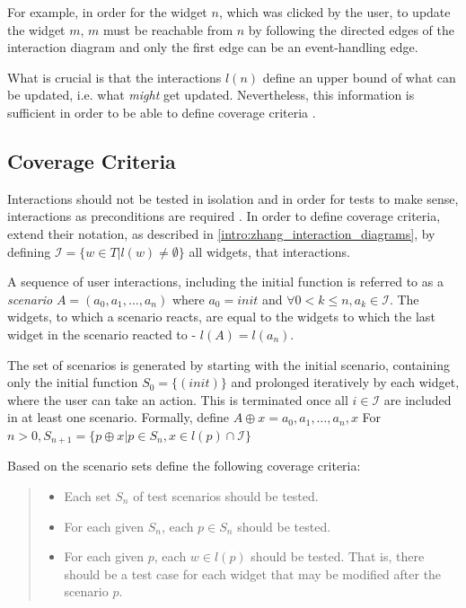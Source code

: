 For example, in order for the widget $n$, which was clicked by the user, to update the widget $m$, $m$ must be reachable from $n$ by following the directed edges of the interaction diagram and only the first edge can be an event-handling edge.

What is crucial is that the interactions $l(n)$ define an upper bound of what can be updated, i.e. what \textit{might} get updated. Nevertheless, this information is sufficient in order to be able to define coverage criteria \parencite{zhang2019scenario}.

\subsection{Coverage Criteria}
Interactions should not be tested in isolation and in order for tests to make sense, interactions as preconditions are required \parencite{zhang2019scenario}. 
In order to define coverage criteria, \textcite{zhang2019scenario} extend their notation, as described in \ref{intro:zhang_interaction_diagrams}, by defining $\mathcal{I}  = \{w\in T | l(w) \neq \emptyset \}$ all widgets, that interactions.

A sequence of user interactions, including the initial function is referred to as a \textit{scenario} $A=(a_0,a_1,\ldots, a_n)$ where $a_0=init$ and $\forall0 < k \leq n, a_k \in \mathcal{I}$. The widgets, to which a scenario reacts, are equal to the widgets to which the last widget in the scenario reacted to - $l(A)=l(a_n)$. 


The set of scenarios is generated by starting with the initial scenario, containing only the initial function $S_0 = \{(init)\}$ and prolonged  iteratively by each widget, where the user can take an action. This is terminated once all $i \in \mathcal{I}$ are included in at least one scenario. 
Formally, define $A \oplus x = a_0,a_1,\ldots,a_n,x$ For $n > 0, S_{n+1}= \{ p \oplus x |p \in S_n, x \in l(p) \cap \mathcal{I}\}$ 

Based on the scenario sets \textcite{zhang2019scenario} define the following coverage criteria:
\begin{quote}
\begin{itemize}
  \item Each set $S_n$ of test scenarios should be tested.
  \item For each given $S_n$, each $p \in S_n$ should be tested.
  \item For each given $p$, each $w \in l(p)$ should be tested. That is, there should be a
  test case for each widget that may be modified after the scenario $p$.
\end{itemize} 
\end{quote}

